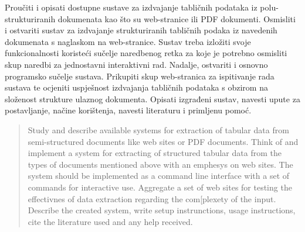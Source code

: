 \documentclass[times, utf8, zavrsni]{fer}
\begin{document}
\begin{sazetak}

Proučiti i opisati dostupne sustave za izdvajanje tabličnih podataka iz
polu-strukturiranih dokumenata kao što su web-stranice ili PDF dokumenti.
Osmisliti i ostvariti sustav za izdvajanje strukturiranih tabličnih podaka iz
navedenih dokumenata s naglaskom na web-stranice.
Sustav treba izložiti svoje funkcionalnosti koristeći sučelje naredbenog retka
za koje je potrebno osmisliti skup naredbi za jednostavni interaktivni rad.
Nadalje, ostvariti i osnovno programsko sučelje sustava. Prikupiti skup
web-stranica za ispitivanje rada sustava te ocjeniti uspješnost izdvajanja
tabličnih podataka s obzirom na složenost strukture ulaznog dokumenta. Opisati
izgrađeni sustav, navesti upute za postavljanje, načine korištenja, navesti
literaturu i primljenu pomoć.

\kljucnerijeci{}
\end{sazetak}

\begin{abstract}

Study and describe available systems for extraction of tabular data from
semi-structured documents like web sites or PDF documents. Think of and
implement a system for extracting of structured tabular data from the types of
documents mentioned above with an emphesys on web sites.
The system should be implemented as a command line interface with a set of
commands for interactive use. Aggregate a set of web sites for testing the
effectivnes of data extraction regarding the com[plexety of the input.
Describe the created system, write setup instrunctions, usage instructions,
cite the literature used and any help received.

\keywords{}
\end{abstract}
\end{document}
